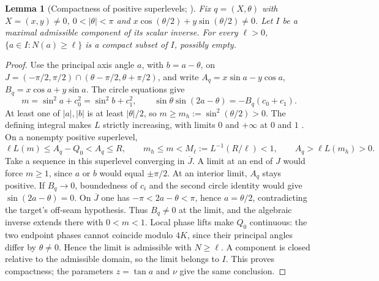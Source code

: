\documentclass[11pt]{article}
\newtheorem{lemma}[theorem]{Lemma}
\theoremstyle{remark}
\begin{document}
\begin{lemma}[Compactness of positive superlevels; {\cite[Proposition~2.4]{SE2Counts}}]\label{lem:positive-superlevels}
Fix $q=(X,\theta)$ with $X=(x,y)\ne0$, $0<|\theta|<\pi$ and
$x\cos(\theta/2)+y\sin(\theta/2)\ne0$.  Let $I$ be a maximal
admissible component of its scalar inverse.  For every $\ell>0$,
$\{a\in I:N(a)\ge\ell\}$ is a compact subset of $I$, possibly empty.
\end{lemma}
\begin{proof}
Use the principal axis angle $a$, with $b=a-\theta$, on
$J=(-\pi/2,\pi/2)\cap(\theta-\pi/2,\theta+\pi/2)$, and write
$A_q=x\sin a-y\cos a$, $B_q=x\cos a+y\sin a$.
The circle equations give
\[
 m=\sin^2a+c_0^2=\sin^2b+c_1^2,\qquad
 \sin\theta\sin(2a-\theta)=-B_q(c_0+c_1).
\]
At least one of $|a|,|b|$ is at least $|\theta|/2$, so
$m\ge m_h:=\sin^2(\theta/2)>0$.  The defining integral makes $L$
strictly increasing, with limits $0$ and $+\infty$ at $0$ and $1$
\cite[Sections 19.2, 19.12]{DLMF}.
On a nonempty positive superlevel,
\[
 \ell L(m)\le A_q-Q_0<A_q\le R,\qquad
 m_h\le m<M_\ell:=L^{-1}(R/\ell)<1,\qquad
 A_q>\ell L(m_h)>0.
\]
Take a sequence in this superlevel converging in $\overline J$.
A limit at an end of $J$ would force $m\ge1$, since $a$ or $b$
would equal $\pm\pi/2$.  At an interior limit, $A_q$ stays positive.
If $B_q\to0$, boundedness of $c_i$ and the second circle identity
would give $\sin(2a-\theta)=0$.  On $\overline J$ one has
$-\pi<2a-\theta<\pi$, hence $a=\theta/2$, contradicting the
target's off-seam hypothesis.  Thus $B_q\ne0$ at the limit, and
the algebraic inverse extends there with $0<m<1$.
Local phase lifts make $Q_0$ continuous: the two endpoint phases
cannot coincide modulo $4K$, since their principal angles differ
by $\theta\ne0$.  Hence the limit is admissible with $N\ge\ell$.
A component is closed relative to the admissible domain, so the
limit belongs to $I$.  This proves compactness; the parameters
$z=\tan a$ and $\nu$ give the same conclusion.
\end{proof}
\end{document}
